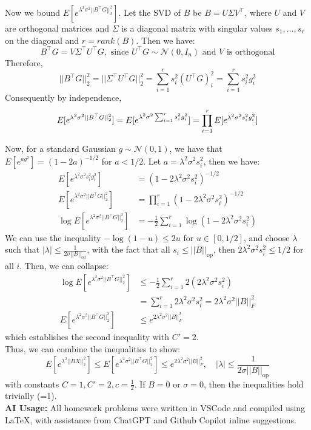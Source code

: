 \documentclass[11pt,a4paper,margin=1in]{article}
\begin{document}
Now we bound $E[e^{\lambda^2 \sigma^2 ||B^\top G||_2^2}]$. Let the SVD of $B$
be $B = U \Sigma V^\top$, where $U$ and $V$ are orthogonal matrices and $\Sigma$ 
is a diagonal matrix with singular values $s_1, \dots, s_r$ on the diagonal and 
$r = rank(B)$. Then we have:
\[
    B^\top G = V \Sigma^\top U^\top G, \text{ since } U^\top G \sim \mathcal{N}(0, I_n) \text{ and } V \text{ is orthogonal}
\]
Therefore,
\[
    ||B^\top G||_2^2 = ||\Sigma^\top U^\top G||_2^2 = \sum_{i=1}^r s_i^2 (U^\top G)_i^2 = \sum_{i=1}^r s_i^2 g_i^2
\]
Consequently by independence,
\[
    E[e^{\lambda^2 \sigma^2 ||B^\top G||_2^2}] = E[e^{\lambda^2 \sigma^2 \sum_{i=1}^r s_i^2 g_i^2}] = \prod_{i=1}^r E[e^{\lambda^2 \sigma^2 s_i^2 g_i^2}] \\
\]

\noindent
Now, for a standard Gaussian $g \sim \mathcal{N}(0, 1)$, we have that 
$E[e^{a g^2}] = (1 - 2a)^{-1/2}$ for $a < 1/2$. Let $a = \lambda^2 \sigma^2 s_i^2$, 
then we have:
\begin{align*}
    E[e^{\lambda^2 \sigma^2 s_i^2 g_i^2}] &= (1 - 2\lambda^2 \sigma^2 s_i^2)^{-1/2} \\
    E[e^{\lambda^2 \sigma^2 ||B^\top G||_2^2}] &= \prod_{i=1}^r (1 - 2\lambda^2 \sigma^2 s_i^2)^{-1/2} \\
    \log E[e^{\lambda^2 \sigma^2 ||B^\top G||_2^2}] &= -\frac{1}{2} \sum_{i=1}^r \log(1 - 2\lambda^2 \sigma^2 s_i^2)
\end{align*}
We can use the inequality $-\log(1 - u) \leq 2u$ for $u \in [0, 1/2]$, and choose
$\lambda$ such that $|\lambda| \leq \frac{1}{2\sigma ||B||_\text{op}}$, with
the fact that all $s_i \leq ||B||_\text{op}$, then 
$2\lambda^2 \sigma^2 s_i^2 \leq 1/2$ for all $i$. Then, we can collapse:
\begin{align*}
    \log E[e^{\lambda^2 \sigma^2 ||B^\top G||_2^2}] &\leq -\frac{1}{2} \sum_{i=1}^r 2(2\lambda^2 \sigma^2 s_i^2) \\
    &= \sum_{i=1}^r 2\lambda^2 \sigma^2 s_i^2 = 2\lambda^2 \sigma^2 ||B||_F^2 \\
    E[e^{\lambda^2 \sigma^2 ||B^\top G||_2^2}] &\leq e^{2\lambda^2 \sigma^2 ||B||_F^2}
\end{align*}
which establishes the second inequality with $C' = 2$. \\

\noindent
Thus, we can combine the inequalities to show:
\[
    E[e^{\lambda^2 ||BX||_2^2}] \leq E[e^{\lambda^2 \sigma^2 ||B^\top G||_2^2}] \leq e^{2\lambda^2 \sigma^2 ||B||_F^2}, \quad |\lambda| \leq \frac{1}{2\sigma ||B||_\text{op}}
\]
with constants $C = 1, C' = 2, c = \frac{1}{2}$. If $B = 0$ or $\sigma = 0$,
then the inequalities hold trivially (=1). \\

\noindent 
\textbf{AI Usage:} All homework problems were written in VSCode and compiled using LaTeX, with 
assistance from ChatGPT and Github Copilot inline suggestions.
\end{document}
